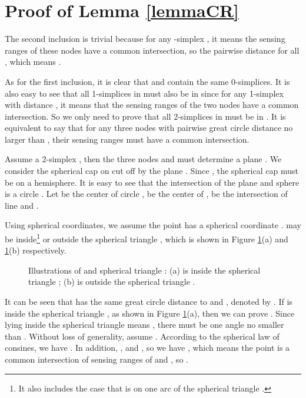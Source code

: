 \documentclass[journal, twoside]{IEEEtran}
\begin{document}
\appendices
\section{Proof of Lemma \ref{lemmaCR}} \label{app1}

\begin{IEEEproof}
The second inclusion is trivial because for any -simplex 
, 
it means the sensing ranges of these nodes have a common intersection,
so the pairwise distance  for all ,
which means  .

As for the first inclusion, it is clear that 
and  contain the same 0-simplices.
It is also easy to see that all 1-simplices
in  must also be in 
 since for any 1-simplex 
with distance , it means that the sensing ranges of the two nodes
have a common intersection. So we only need to prove that all 2-simplices in 
 must be in .
It is equivalent to say that for any three nodes with pairwise great circle distance no larger than
, their sensing ranges must have a common intersection. 

Assume a 2-simplex ,
then the three nodes  and  must determine a plane . We consider
the spherical cap on  cut off by the plane . Since 
, the spherical cap must be on a hemisphere. It is easy
to see that the intersection of the plane  and sphere 
is a circle . Let  be the center of circle ,  be the center of ,
 be the intersection of line  and .

Using spherical coordinates, we assume the point  has a spherical coordinate .
 may be inside\footnote{It also includes the case that  is on one arc of the spherical
triangle .} or outside the spherical triangle , which is shown in
Figure \ref{sphericaltri}(a) and \ref{sphericaltri}(b) respectively. 

\begin{figure}[ht]
  \centering {}  
  \caption{Illustrations of  and spherical triangle : (a)  is 
  inside the spherical triangle ; (b)  is outside the spherical triangle . }
  \label{sphericaltri}
\end{figure}

It can be seen that  has the same 
great circle distance to  and , denoted by . If  is inside
the spherical triangle , as shown in Figure \ref{sphericaltri}(a), then we can prove . Since
 lying inside the spherical triangle  means ,
there must be one angle no smaller than . Without loss of generality, assume
. According to  the spherical law of consines, we have
. In addition,
, and , so we have
, which means the point  is a common intersection
of sensing ranges of  and , so .


\end{IEEEproof}
\end{document}
